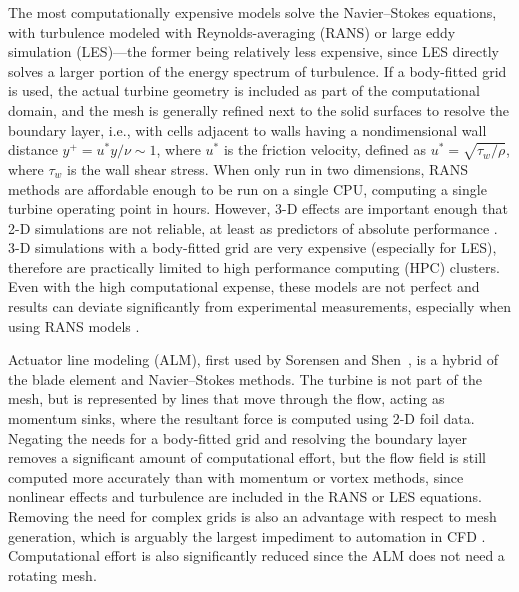 The most computationally expensive models solve the Navier--Stokes equations,
with turbulence modeled with Reynolds-averaging (RANS) or large eddy simulation
(LES)---the former being relatively less expensive, since LES directly solves a
larger portion of the energy spectrum of turbulence. If a body-fitted grid is
used, the actual turbine geometry is included as part of the computational
domain, and the mesh is generally refined next to the solid surfaces to resolve
the boundary layer, i.e., with cells adjacent to walls having a nondimensional
wall distance $y^+ = u^* y / \nu \sim 1$, where $u^*$ is the friction velocity,
defined as $u^*=\sqrt{\tau_w / \rho}$, where $\tau_w$ is the wall shear stress.
When only run in two dimensions, RANS methods are affordable enough to be run on
a single CPU, computing a single turbine operating point in hours. However, 3-D
effects are important enough that 2-D simulations are not reliable, at least as
predictors of absolute performance \cite{Li2013}. 3-D simulations with a
body-fitted grid are very expensive (especially for LES), therefore are
practically limited to high performance computing (HPC) clusters. Even with the
high computational expense, these models are not perfect and results can deviate
significantly from experimental measurements, especially when using RANS models
\cite{Li2013}.

Actuator line modeling (ALM), first used by Sorensen and
Shen~\cite{Sorensen2002}, is a hybrid of the blade element and Navier--Stokes
methods. The turbine is not part of the mesh, but is represented by lines that
move through the flow, acting as momentum sinks, where the resultant force is
computed using 2-D foil data. Negating the needs for a body-fitted grid and
resolving the boundary layer removes a significant amount of computational
effort, but the flow field is still computed more accurately than with momentum
or vortex methods, since nonlinear effects and turbulence are included in the
RANS or LES equations. Removing the need for complex grids is also an advantage
with respect to  mesh generation, which is arguably the largest impediment to
automation in CFD \cite{Slotnick2014}. Computational effort is also
significantly reduced since the ALM does not need a rotating mesh.

